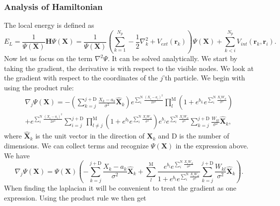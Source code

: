 \subsubsection{Analysis of Hamiltonian}
The local energy is defined as 
\begin{equation*}
E_L = \frac{1}{\Psi(\textbf{X})}\textbf{H}\Psi(\textbf{X}) = \frac{1}{\Psi(\textbf{X})} \left(\sum_{k=1}^{N_p} -\frac{1}{2}\nabla_k^2 + V_{ext}(\mathbf{r}_k)\right)\Psi(\textbf{X})+\sum_{k<i}^{N_p} V_{int}(\mathbf{r}_k,\mathbf{r}_i).
\label{eq_loc_e}
\end{equation*}
Now let us focus on the term $\nabla^2\Psi$. It can be solved analytically. We start by taking the gradient, the derivative is with respect to the visible nodes. We look at the gradient with respect to the coordinates of the $j$'th particle. We begin with using the product rule:
\begin{align*}
\nabla_j\Psi(\textbf{X}) = -\left(\sum_{k=j}^{j+\text{D}}\frac{X_k-a_k}{\sigma^2}\hat{\textbf{X}}_k \right) e^{\sum_i^{\text{N}}\frac{(X_i-a_i)^2}{2\sigma^2}} \prod_l^{\text{M}}\left(1+e^{b_L}e^{\sum_i^{\text{N}}\frac{X_iW_{il}}{\sigma^2}}\right) \\
+ e^{\sum_i^{\text{N}}\frac{(X_i-a_i)^2}{2\sigma^2}} \sum_ {i=j}^{j+\text{D}}\prod_{l\neq j}^{\text{M}} \left(1+e^{b_l}e^{\sum_i^{\text{N}}\frac{X_iW_{il}}{\sigma^2}}\right) e^{b_j}e^{\sum_i^{\text{N}}\frac{X_iW_{il}}{\sigma^2}}\sum_ {k=j}^{j+\text{D}}\frac{W_{kl}}{\sigma^2}\hat{\textbf{X}}_k,
\end{align*}
where $\hat{\textbf{X}}_k$ is the unit vector in the direction of $\textbf{X}_k$ and D is the number of dimensions. We can collect terms and recognize $\Psi(\textbf{X})$ in the expression above. We have
\begin{equation}
\nabla_j \Psi(\textbf{X}) = \Psi(\textbf{X})\left(  -\sum_{k=j}^{j+\text{D}} \frac{X_k-a_k}{\sigma^2} \hat{\textbf{X}}_k  + \sum_{l}^{\text{M}}\frac{e^{b_l}e^{\sum_{i}^{\text{N}}\frac{X_iW_{il}}{\sigma^2}}}{1+e^{b_l}e^{\sum_{i}^{\text{N}}\frac{X_iW_{il}}{\sigma^2}}}  \sum_{k=j}^{j+\text{D}} \frac{W_{kl}}{\sigma^2} \hat{\textbf{X}}_k    \right).
\label{eq_gradient}
\end{equation}
When finding the laplacian it will be convenient to treat the gradient as one expression. Using the product rule we then get
